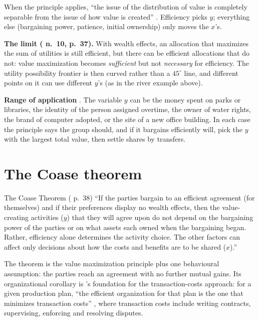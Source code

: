 \begin{keyidea}
When the principle applies, ``the issue of the distribution of value is completely separable
from the issue of how value is created'' . Efficiency picks $y$; everything else
(bargaining power, patience, initial ownership) only moves the $x$'s.
\end{keyidea}

\textbf{The limit (\MR{} n.~10, p.~37).} With wealth effects, an allocation that maximizes the
sum of utilities is still efficient, but there can be efficient allocations that do not: value
maximization becomes \emph{sufficient} but not \emph{necessary} for efficiency. The utility
possibility frontier is then curved rather than a $45^\circ$ line, and different points on it
can use different $y$'s (as in the river example above).

\textbf{Range of application} . The variable $y$ can be the money spent on parks or
libraries, the identity of the person assigned overtime, the owner of water rights, the brand of
computer adopted, or the site of a new office building. In each case the principle says the
group should, and if it bargains efficiently will, pick the $y$ with the largest total value,
then settle shares by transfers.

\section{The Coase theorem}\label{sec:b-coase}

\begin{prop}{The Coase Theorem (\MR{} p.~38)}
``If the parties bargain to an efficient agreement (for themselves) and if their preferences
display no wealth effects, then the value-creating activities ($y$) that they will agree upon do
not depend on the bargaining power of the parties or on what assets each owned when the
bargaining began. Rather, efficiency alone determines the activity choice. The other factors can
affect only decisions about how the costs and benefits are to be shared ($x$).''
\end{prop}

The theorem is the value maximization principle plus one behavioural assumption: the parties
reach an agreement with no further mutual gains. Its organizational corollary is \MR's
foundation for the transaction-costs approach: for a given production plan, ``the efficient
organization for that plan is the one that minimizes transaction costs'' , where
transaction costs include writing contracts, supervising, enforcing and resolving disputes.

